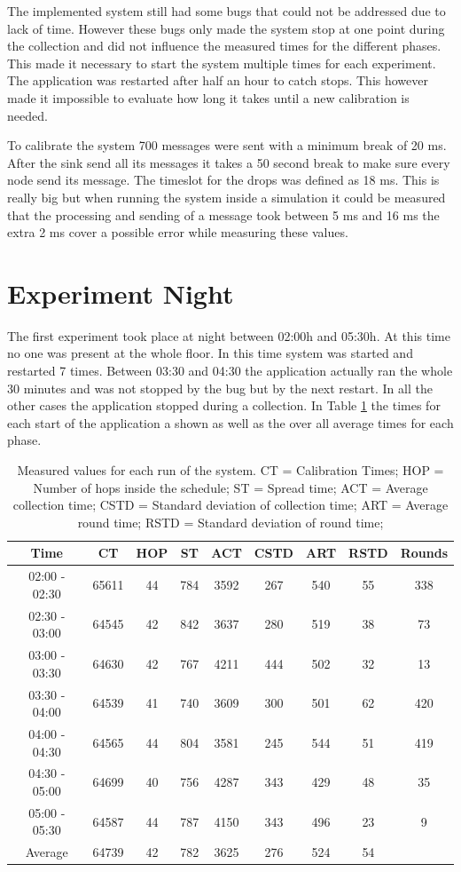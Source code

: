 The implemented system still had some bugs that could not be addressed due to lack of time. However these bugs only made the system stop at one point during the collection and did not influence the measured times for the different phases. This made it necessary to start the system multiple times for each experiment. The application was restarted after half an hour to catch stops. This however made it impossible to evaluate how long it takes until a new calibration is needed.

To calibrate the system 700 messages were sent with a minimum break of 20 ms. After the sink send all its messages it takes a 50 second break to make sure every node send its message. The timeslot for the drops was defined as 18 ms. This is really big but when running the system inside a simulation it could be measured that the processing and sending of a message took between 5 ms and 16 ms the extra 2 ms cover a possible error while measuring these values.  
\section{Experiment Night}
The first experiment took place at night between 02:00h and 05:30h. At this time no one was present at the whole floor. In this time system was started and restarted 7 times. Between 03:30 and 04:30 the application actually ran the whole 30 minutes and was not stopped by the bug but by the next restart. In all the other cases the application stopped during a collection. In Table \ref{tab:NightTable} the times for each start of the application a shown as well as the over all average times for each phase. 

\begin{table}[htbp]
 \caption{Measured values for each run of the system. CT = Calibration Times; HOP = Number of hops inside the schedule; ST = Spread time; ACT = Average collection time; CSTD = Standard deviation of collection time; ART = Average round time; RSTD = Standard deviation of round time;}
 \centering
 \begin{tabular}{c||c|c|c|c|c|c|c|c}
  Time & CT & HOP & ST & ACT & CSTD & ART & RSTD & Rounds\\ \toprule
  02:00 - 02:30 & 65611 & 44 & 784 & 3592 & 267 & 540 & 55 & 338\\
  02:30 - 03:00 & 64545 & 42 & 842 & 3637 & 280 & 519 & 38 & 73\\
  03:00 - 03:30 & 64630 & 42 & 767 & 4211 & 444 & 502 & 32 & 13\\
  03:30 - 04:00 & 64539 & 41 & 740 & 3609 & 300 & 501 & 62 & 420\\
  04:00 - 04:30 & 64565 & 44 & 804 & 3581 & 245 & 544 & 51 & 419\\
  04:30 - 05:00 & 64699 & 40 & 756 & 4287 & 343 & 429 & 48 & 35\\
  05:00 - 05:30 & 64587 & 44 & 787 & 4150 & 343 & 496 & 23 & 9\\ \toprule
  Average & 64739 & 42 & 782 & 3625 & 276 & 524 & 54 & \\
 \end{tabular}
 \label{tab:NightTable}
\end{table}

